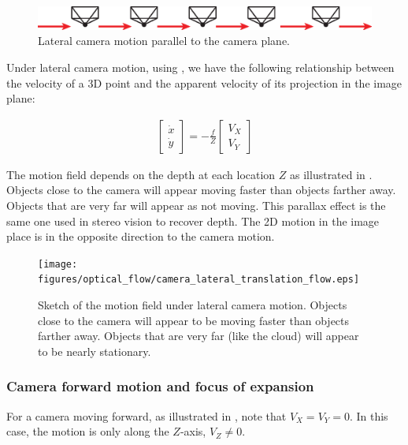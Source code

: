\begin{figure}
    \centerline{
        \includegraphics[width=1\linewidth]{figures/optical_flow/camera_lateral_translation.eps}
    }
    \caption{Lateral camera motion parallel to the camera plane.}
    \label{fig:camera_lateral_translation}
\end{figure}

Under lateral camera motion, using \eqn{\ref{eq:parallelmotion}}, we have the following relationship between the velocity of a 3D point and the apparent velocity of its projection in the image plane:

\begin{align}
    \begin{bmatrix}
        \dot{x} \\
        \dot{y}
    \end{bmatrix}
    =
    -\frac{f}{Z}
    \begin{bmatrix}
        V_X \\
        V_Y
    \end{bmatrix}
\end{align}

The motion field depends on the depth at each location $Z$ as illustrated in \fig{\ref{fig:camera_lateral_translation_flow}}. Objects close to the camera will appear moving faster than objects farther away. Objects that are very far will appear as not moving. This parallax effect is the same one used in stereo vision to recover depth. The 2D motion in the image place is in the opposite direction to the camera motion.

\begin{figure}[h!]
    \centerline{
        \texttt{[image: figures/optical\_flow/camera\_lateral\_translation\_flow.eps]}
    }
    \caption{Sketch of the motion field under lateral camera motion. Objects close to the camera will appear to be moving faster than objects farther away. Objects that are very far (like the cloud) will appear to be nearly stationary.}
    \label{fig:camera_lateral_translation_flow}
\end{figure}

\subsubsection{Camera forward motion and focus of expansion}
For a camera moving forward, as illustrated in \fig{\ref{fig:camera_forward_translation}}, note that $V_X = V_Y = 0$. In this case, the motion is only along the $Z$-axis, $V_Z \neq 0$.

